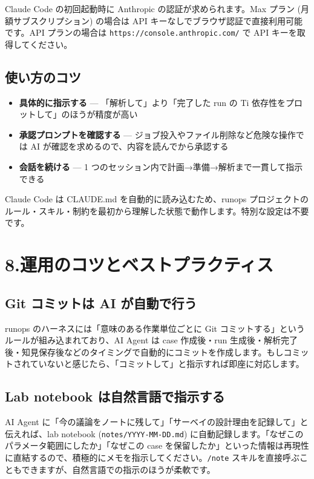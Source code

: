 \documentclass[a4paper,11pt]{article}
\newenvironment{infobox}{%
  \medskip\noindent
  \fboxrule=0.5pt\fboxsep=8pt
  \fcolorbox{infoframe}{infobg}\bgroup\minipage{\dimexpr\linewidth-2\fboxsep-2\fboxrule}
}{%
  \endminipage\egroup\medskip
}
\begin{document}
Claude Code の初回起動時に Anthropic の認証が求められます。Max プラン (月額サブスクリプション) の場合は API キーなしでブラウザ認証で直接利用可能です。API プランの場合は \texttt{https://console.anthropic.com/} で API キーを取得してください。

\subsection*{\color{accent} 使い方のコツ}

\begin{itemize}[nosep]
  \item \textbf{具体的に指示する} --- 「解析して」より「完了した run の Ti 依存性をプロットして」のほうが精度が高い
  \item \textbf{承認プロンプトを確認する} --- ジョブ投入やファイル削除など危険な操作では AI が確認を求めるので、内容を読んでから承認する
  \item \textbf{会話を続ける} --- 1 つのセッション内で計画→準備→解析まで一貫して指示できる
\end{itemize}

\begin{infobox}
Claude Code は CLAUDE.md を自動的に読み込むため、runops プロジェクトのルール・スキル・制約を最初から理解した状態で動作します。特別な設定は不要です。
\end{infobox}

\section*{\color{darkblue} 8.\quad 運用のコツとベストプラクティス}

\subsection*{\color{accent} Git コミットは AI が自動で行う}

runops のハーネスには「意味のある作業単位ごとに Git コミットする」というルールが組み込まれており、AI Agent は case 作成後・run 生成後・解析完了後・知見保存後などのタイミングで自動的にコミットを作成します。もしコミットされていないと感じたら、「コミットして」と指示すれば即座に対応します。

\subsection*{\color{accent} Lab notebook は自然言語で指示する}

AI Agent に「今の議論をノートに残して」「サーベイの設計理由を記録して」と伝えれば、lab notebook (\texttt{notes/YYYY-MM-DD.md}) に自動記録します。「なぜこのパラメータ範囲にしたか」「なぜこの case を保留したか」といった情報は再現性に直結するので、積極的にメモを指示してください。\texttt{/note} スキルを直接呼ぶこともできますが、自然言語での指示のほうが柔軟です。
\end{document}

